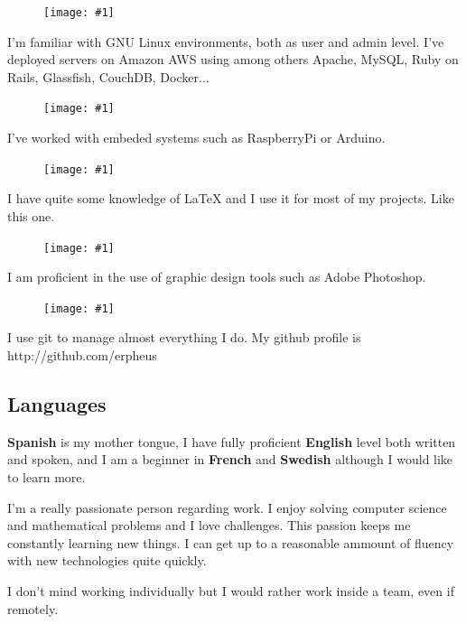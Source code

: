 \documentclass[a4paper, 10pt]{article}
\newcommand{\CVSubsection}[1]{ { \setromanfont[Numbers=Uppercase]{Helvetica}\selectfont \subsection*{#1} } }
\newcommand{\skill}[5]{
			\begin{minipage}{0.85\linewidth}
				\begin{figure} 
					\vspace{#3}

					\hspace*{#5}\texttt{[image: \#1]}
				\end{figure} {#2}
			\end{minipage}
		}
\begin{document}
\begin{multicols}{2}
				\vspace{2mm}

				\skill{images/linux.png}{I'm familiar with GNU Linux environments, both as user and admin level. I've deployed servers on Amazon AWS using among others Apache, MySQL, Ruby on Rails, Glassfish, CouchDB, Docker...}{-4mm}{1.2cm}{0.5mm}

				\vspace{2mm}

				\skill{images/raspberry.png}{I've worked with embeded systems such as RaspberryPi or Arduino.}{-4.5mm}{0.8cm}{2.2mm}

				\vspace{2mm}

				\skill{images/tex.png}{I have quite some knowledge of LaTeX and I use it for most of my projects. Like this one.}{-6mm}{0.9cm}{2.2mm}

				\vspace{2mm}

				\skill{images/photoshop.png}{I am proficient in the use of graphic design tools such as Adobe Photoshop.}{-5mm}{0.8cm}{2.5mm}

				\vspace{2mm}

				\skill{images/git.png}{I use git to manage almost everything I do. My github profile is http://github.com/erpheus}{-4.5mm}{0.8cm}{2.5mm}	

				\setlength{\leftskip}{0mm}

				\vspace{2mm}
				\CVSubsection{Languages}
				\vspace{-2mm}
				{\fontsize{1.1em}{1em}\selectfont \textbf{Spanish}} is my mother tongue, I have fully proficient {\fontsize{1.1em}{1em}\selectfont \textbf{English}} level both written and spoken, and I am a beginner in {\fontsize{1.1em}{1em}\selectfont \textbf{French}} and {\fontsize{1.1em}{1em}\selectfont \textbf{Swedish}} although I would like to learn more.		


	\end{multicols}

	\vfill

	{\fontsize{1.35em}{1.4em}\selectfont 
		I’m a really passionate person regarding work. I enjoy solving computer science and mathematical problems and I love challenges. This passion keeps me constantly learning new things. I can get up to a reasonable ammount of fluency with new technologies quite quickly.

		\vspace{2mm}

		I don’t mind working individually but I would rather work inside a team, even if remotely.
	}
\end{document}
